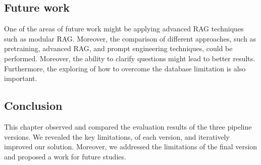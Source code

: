 \subsection{Future work}

One of the areas of future work might be applying advanced RAG techniques such as modular RAG. Moreover, the comparison of different approaches, such as pretraining, advanced RAG, and prompt engineering techniques, could be performed. Moreover, the ability to clarify questions might lead to better results. Furthermore, the exploring of how to overcome the database limitation is also important.

\subsection{Conclusion}

This chapter observed and compared the evaluation results of the three pipeline versions. We revealed the key limitations, of each version, and iteratively improved our solution. Moreover, we addressed the limitations of the final version and proposed a work for future studies.



